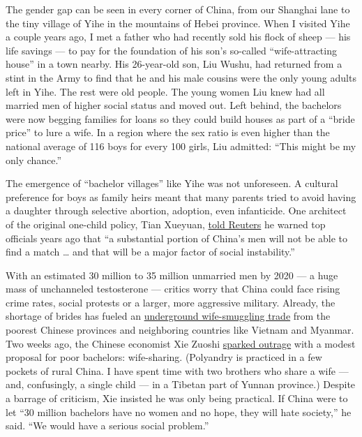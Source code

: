 The gender gap can be seen in every corner of China, from our Shanghai
lane to the tiny village of Yihe in the mountains of Hebei province.
When I visited Yihe a couple years ago, I met a father who had recently
sold his flock of sheep --- his life savings --- to pay for the
foundation of his son's so-called ``wife-attracting house'' in a town
nearby. His 26-year-old son, Liu Wushu, had returned from a stint in the
Army to find that he and his male cousins were the only young adults
left in Yihe. The rest were old people. The young women Liu knew had all
married men of higher social status and moved out. Left behind, the
bachelors were now begging families for loans so they could build houses
as part of a ``bride price'' to lure a wife. In a region where the sex
ratio is even higher than the national average of 116 boys for every 100
girls, Liu admitted: ``This might be my only chance.''

The emergence of ``bachelor villages'' like Yihe was not unforeseen. A
cultural preference for boys as family heirs meant that many parents
tried to avoid having a daughter through selective abortion, adoption,
even infanticide. One architect of the original one-child policy, Tian
Xueyuan,
\href{http://www.reuters.com/article/2013/01/22/us-china-population-idUSBRE90K0UV20130122}{told
Reuters} he warned top officials years ago that ``a substantial portion
of China's men will not be able to find a match \ldots{} and that will
be a major factor of social instability.''

With an estimated 30 million to 35 million unmarried men by 2020 --- a
huge mass of unchanneled testosterone --- critics worry that China could
face rising crime rates, social protests or a larger, more aggressive
military. Already, the shortage of brides has fueled an
\href{http://www.globaltimes.cn/content/814283.shtml}{underground
wife-smuggling trade} from the poorest Chinese provinces and neighboring
countries like Vietnam and Myanmar. Two weeks ago, the Chinese economist
Xie Zuoshi
\href{http://www.bbc.com/news/world-asia-china-34612919}{sparked
outrage} with a modest proposal for poor bachelors: wife-sharing.
(Polyandry is practiced in a few pockets of rural China. I have spent
time with two brothers who share a wife --- and, confusingly, a single
child --- in a Tibetan part of Yunnan province.) Despite a barrage of
criticism, Xie insisted he was only being practical. If China were to
let ``30 million bachelors have no women and no hope, they will hate
society,'' he said. ``We would have a serious social problem.''

